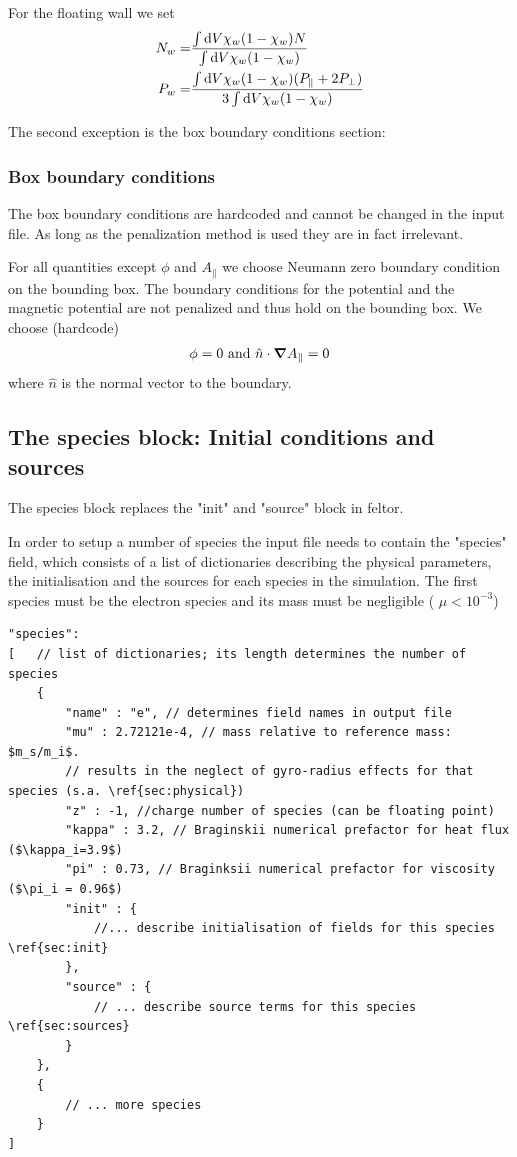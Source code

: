 For the floating wall we set
\begin{align}
    N_w =& \frac{\int \mathrm{d} V \chi_w (1-\chi_w) N }{ \int \mathrm{d} V \chi_w ( 1-\chi_w)} \\
    P_w =& \frac{\int \mathrm{d} V \chi_w (1-\chi_w) (P_\parallel + 2P_\perp) }{ 3\int \mathrm{d} V \chi_w ( 1-\chi_w) }
\end{align}

The second exception is the box boundary conditions section:
\subsubsection{Box boundary conditions}
\begin{tcolorbox}[title=Note]
The box boundary conditions are hardcoded and cannot be changed in the input file.
As long as the penalization method is used they are in fact irrelevant.
\end{tcolorbox}
For all quantities except $\phi$ and $A_\parallel$ we choose Neumann zero boundary
condition on the bounding box.
The boundary conditions for the potential and the magnetic potential are not
penalized and thus hold on the bounding box. We choose (hardcode)
\begin{align}
\phi = 0
\text{ and }  \hat n \cdot{\boldsymbol{\nabla}} A_{\parallel} = 0
\end{align}
where $\hat n$ is the normal vector to the boundary.

\subsection{The species block: Initial conditions and sources} \label{sec:species}
The species block replaces the "init" and "source" block in feltor.

In order to setup a number of species the input file needs to contain the "species" field, which
consists of a list of dictionaries describing the physical parameters, the initialisation and the sources
for each species in the simulation. The first species must be the electron species and its mass
    must be negligible ( $\mu <10^{-3}$)
\begin{verbatim}
"species":
[   // list of dictionaries; its length determines the number of species
    {
        "name" : "e", // determines field names in output file
        "mu" : 2.72121e-4, // mass relative to reference mass: $m_s/m_i$.
        // results in the neglect of gyro-radius effects for that species (s.a. \ref{sec:physical})
        "z" : -1, //charge number of species (can be floating point)
        "kappa" : 3.2, // Braginskii numerical prefactor for heat flux ($\kappa_i=3.9$)
        "pi" : 0.73, // Braginksii numerical prefactor for viscosity ($\pi_i = 0.96$)
        "init" : {
            //... describe initialisation of fields for this species \ref{sec:init}
        },
        "source" : {
            // ... describe source terms for this species \ref{sec:sources}
        }
    },
    {
        // ... more species
    }
]
\end{verbatim}


